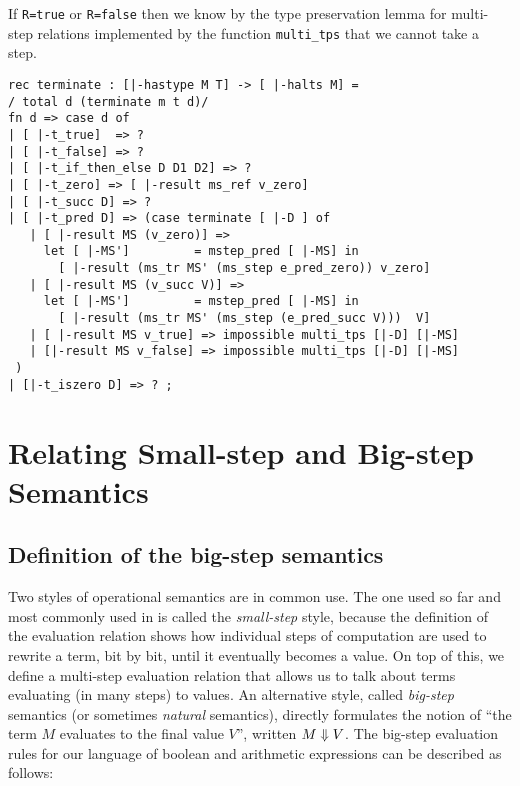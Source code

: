 If \lstinline!R=true! or \lstinline!R=false! then we know by the type
preservation lemma for multi-step relations implemented by the
function \lstinline!multi_tps! that we cannot take a step.



\begin{lstlisting}
rec terminate : [|-hastype M T] -> [ |-halts M] =
/ total d (terminate m t d)/
fn d => case d of
| [ |-t_true]  => ?
| [ |-t_false] => ?
| [ |-t_if_then_else D D1 D2] => ?
| [ |-t_zero] => [ |-result ms_ref v_zero]
| [ |-t_succ D] => ?
| [ |-t_pred D] => (case terminate [ |-D ] of
   | [ |-result MS (v_zero)] =>
     let [ |-MS']         = mstep_pred [ |-MS] in
       [ |-result (ms_tr MS' (ms_step e_pred_zero)) v_zero]
   | [ |-result MS (v_succ V)] =>
     let [ |-MS']         = mstep_pred [ |-MS] in
       [ |-result (ms_tr MS' (ms_step (e_pred_succ V)))  V]
   | [ |-result MS v_true] => impossible multi_tps [|-D] [|-MS]
   | [|-result MS v_false] => impossible multi_tps [|-D] [|-MS]
 )
| [|-t_iszero D] => ? ;
\end{lstlisting}


\section{Relating Small-step and Big-step Semantics}

\subsection{Definition of the big-step semantics}

Two styles of operational semantics are in common use. The one used so far and
most commonly used in \cite{TAPL} is called the {\em small-step} style, because
the definition of the evaluation relation shows how individual steps of
computation are used to rewrite a term, bit by bit, until it eventually becomes
a value. On top of this, we define a multi-step evaluation relation that allows
us to talk about terms evaluating (in many steps) to values. An alternative
style, called {\em big-step} semantics (or sometimes {\em natural} semantics),
directly formulates the notion of ``the term $M$ evaluates to the final value $V$'',
written $M \Downarrow V$. The big-step evaluation rules for our language of
boolean and arithmetic expressions can be described as follows:

